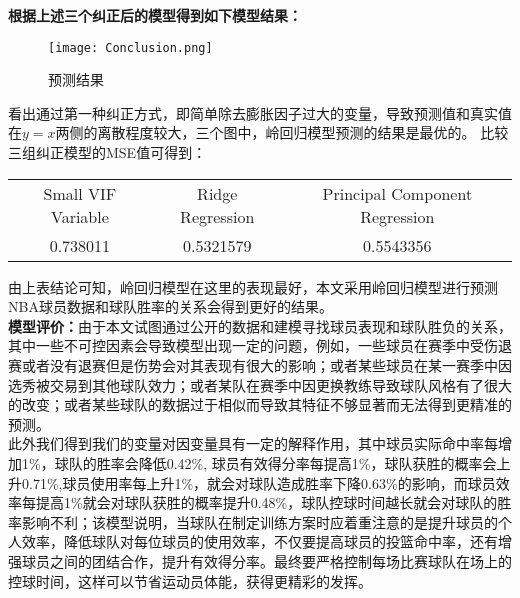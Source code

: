 {\bfseries 根据上述三个纠正后的模型得到如下模型结果：}
\begin{figure}[h!]
	\texttt{[image: Conclusion.png]}
	\centering
	\caption{预测结果}
	\label{fig:18}
\end{figure}
看出通过第一种纠正方式，即简单除去膨胀因子过大的变量，导致预测值和真实值在$y=x$两侧的离散程度较大，三个图中，岭回归模型预测的结果是最优的。
比较三组纠正模型的MSE值可得到：
\begin{table}[h]
	\begin{tabular}{|c|c|c|}
		\hline
		Small VIF Variable& Ridge Regression &Principal Component Regression\\
		0.738011&0.5321579&0.5543356\\
		\hline
	\end{tabular}
\centering
\end{table}
由上表结论可知，岭回归模型在这里的表现最好，本文采用岭回归模型进行预测NBA球员数据和球队胜率的关系会得到更好的结果。\\



{\bfseries 模型评价：}由于本文试图通过公开的数据和建模寻找球员表现和球队胜负的关系，其中一些不可控因素会导致模型出现一定的问题，例如，一些球员在赛季中受伤退赛或者没有退赛但是伤势会对其表现有很大的影响；或者某些球员在某一赛季中因选秀被交易到其他球队效力；或者某队在赛季中因更换教练导致球队风格有了很大的改变；或者某些球队的数据过于相似而导致其特征不够显著而无法得到更精准的预测。\cite{yang2015predicting}
\\
此外我们得到我们的变量对因变量具有一定的解释作用，其中球员实际命中率每增加1\%，球队的胜率会降低0.42\%,
球员有效得分率每提高1\%，球队获胜的概率会上升0.71\%,球员使用率每上升1\%，就会对球队造成胜率下降0.63\%的影响，而球员效率每提高1\%就会对球队获胜的概率提升0.48\%，球队控球时间越长就会对球队的胜率影响不利；该模型说明，当球队在制定训练方案时应着重注意的是提升球员的个人效率，降低球队对每位球员的使用效率，不仅要提高球员的投篮命中率，还有增强球员之间的团结合作，提升有效得分率。最终要严格控制每场比赛球队在场上的控球时间，这样可以节省运动员体能，获得更精彩的发挥。